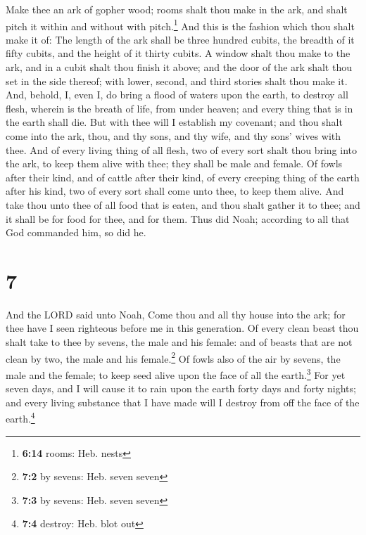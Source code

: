  Make thee an ark of gopher wood; rooms shalt thou make
in the ark, and shalt pitch it within and without with pitch.\footnote{\textbf{6:14}
  rooms: Heb. nests}  And this is the fashion which thou
shalt make it of: The length of the ark shall be three hundred cubits,
the breadth of it fifty cubits, and the height of it thirty cubits.
 A window shalt thou make to the ark, and in a cubit
shalt thou finish it above; and the door of the ark shalt thou set in
the side thereof; with lower, second, and third stories shalt thou make
it.  And, behold, I, even I, do bring a flood of waters
upon the earth, to destroy all flesh, wherein is the breath of life,
from under heaven; and every thing that is in the earth shall die.
 But with thee will I establish my covenant; and thou
shalt come into the ark, thou, and thy sons, and thy wife, and thy sons'
wives with thee.  And of every living thing of all flesh,
two of every sort shalt thou bring into the ark, to keep them alive with
thee; they shall be male and female.  Of fowls after
their kind, and of cattle after their kind, of every creeping thing of
the earth after his kind, two of every sort shall come unto thee, to
keep them alive.  And take thou unto thee of all food
that is eaten, and thou shalt gather it to thee; and it shall be for
food for thee, and for them.  Thus did Noah; according to
all that God commanded him, so did he.

\hypertarget{section-6}{%
\section{7}\label{section-6}}

 And the LORD said unto Noah, Come thou and all thy house
into the ark; for thee have I seen righteous before me in this
generation.  Of every clean beast thou shalt take to thee
by sevens, the male and his female: and of beasts that are not clean by
two, the male and his female.\footnote{\textbf{7:2} by sevens: Heb.
  seven seven}  Of fowls also of the air by sevens, the
male and the female; to keep seed alive upon the face of all the
earth.\footnote{\textbf{7:3} by sevens: Heb. seven seven} 
For yet seven days, and I will cause it to rain upon the earth forty
days and forty nights; and every living substance that I have made will
I destroy from off the face of the earth.\footnote{\textbf{7:4} destroy:
  Heb. blot out}

